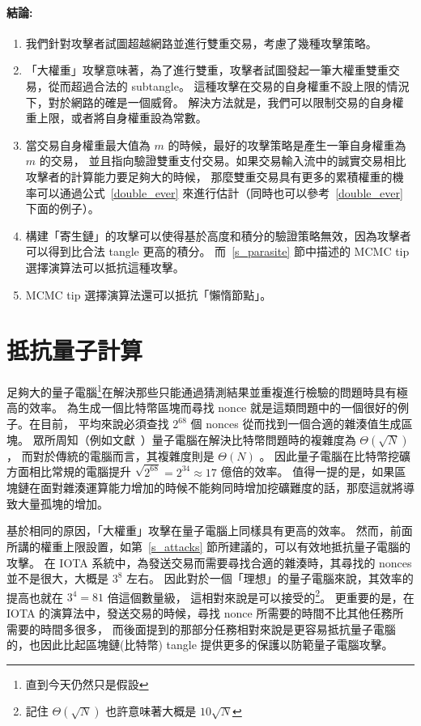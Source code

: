 \documentclass[12pt]{article}
\begin{document}
\begin{CJK}{UTF8}{bkai}
\paragraph{結論:}
\begin{enumerate}
 \item 我們針對攻擊者試圖超越網路並進行雙重交易，考慮了幾種攻擊策略。
 \item 「大權重」攻擊意味著，為了進行雙重，攻擊者試圖發起一筆大權重雙重交易，從而超過合法的 subtangle。
 這種攻擊在交易的自身權重不設上限的情況下，對於網路的確是一個威脅。
 解決方法就是，我們可以限制交易的自身權重上限，或者將自身權重設為常數。
 \item 當交易自身權重最大值為 $m$ 的時候，最好的攻擊策略是產生一筆自身權重為~$m$ 的交易，
 並且指向驗證雙重支付交易。如果交易輸入流中的誠實交易相比攻擊者的計算能力要足夠大的時候，
 那麼雙重交易具有更多的累積權重的機率可以通過公式~\eqref{double_ever} 來進行估計（同時也可以參考~\eqref{double_ever} 下面的例子）。
 \item 構建「寄生鏈」的攻擊可以使得基於高度和積分的驗證策略無效，因為攻擊者可以得到比合法 tangle 更高的積分。
 而~\ref{s_parasite} 節中描述的 MCMC tip 選擇演算法可以抵抗這種攻擊。
\item MCMC tip 選擇演算法還可以抵抗「懶惰節點」。
\end{enumerate}



\section{抵抗量子計算}
\label{s_quantum}
足夠大的量子電腦\footnote{直到今天仍然只是假設}在解決那些只能通過猜測結果並重複進行檢驗的問題時具有極高的效率。
為生成一個比特幣區塊而尋找 nonce 就是這類問題中的一個很好的例子。在目前，
平均來說必須查找 $2^{68}$ 個 nonces 從而找到一個合適的雜湊值生成區塊。
眾所周知（例如文獻~\cite{BHT}）量子電腦在解決比特幣問題時的複雜度為 $\Theta(\sqrt N)$，
而對於傳統的電腦而言，其複雜度則是 $\Theta(N)$ 。
因此量子電腦在比特幣挖礦方面相比常規的電腦提升 $\sqrt{2^{68}}=2^{34}\approx 17$ 億倍的效率。
值得一提的是，如果區塊鏈在面對雜湊運算能力增加的時候不能夠同時增加挖礦難度的話，那麼這就將導致大量孤塊的增加。
 
基於相同的原因，「大權重」攻擊在量子電腦上同樣具有更高的效率。
然而，前面所講的權重上限設置，如第~\ref{s_attacks} 節所建議的，可以有效地抵抗量子電腦的攻擊。
在 IOTA 系統中，為發送交易而需要尋找合適的雜湊時，其尋找的 nonces 並不是很大，大概是 $3^8$ 左右。
因此對於一個「理想」的量子電腦來說，其效率的提高也就在 $3^4=81$ 倍這個數量級，
這相對來說是可以接受的\footnote{記住 $\Theta(\sqrt N)$ 也許意味著大概是 $10\sqrt N$}。
更重要的是，在 IOTA 的演算法中，發送交易的時候，尋找 nonce 所需要的時間不比其他任務所需要的時間多很多，
而後面提到的那部分任務相對來說是更容易抵抗量子電腦的，也因此比起區塊鏈(比特幣) tangle 提供更多的保護以防範量子電腦攻擊。
 



\end{CJK}
\end{document}
